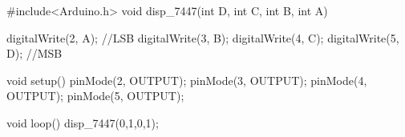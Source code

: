#include<Arduino.h>
void disp_7447(int D, int C, int B, int A)
{
  digitalWrite(2, A); //LSB
  digitalWrite(3, B); 
  digitalWrite(4, C); 
  digitalWrite(5, D); //MSB

}
void setup() {
    pinMode(2, OUTPUT);  
    pinMode(3, OUTPUT);
    pinMode(4, OUTPUT);
    pinMode(5, OUTPUT);
}

void loop() {
disp_7447(0,1,0,1);  
}